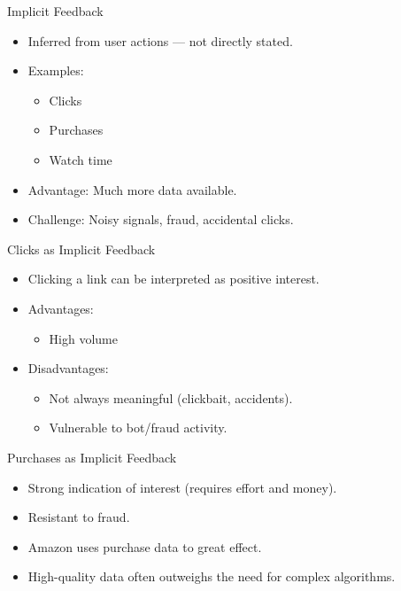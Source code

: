 \documentclass{beamer}
\begin{document}
\begin{frame}{Implicit Feedback}
\begin{itemize}
    \item Inferred from user actions — not directly stated.
    \item Examples:
    \begin{itemize}
        \item Clicks
        \item Purchases
        \item Watch time
    \end{itemize}
    \item Advantage: Much more data available.
    \item Challenge: Noisy signals, fraud, accidental clicks.
\end{itemize}
\end{frame}

\begin{frame}{Clicks as Implicit Feedback}
\begin{itemize}
    \item Clicking a link can be interpreted as positive interest.
    \item Advantages:
    \begin{itemize}
        \item High volume
    \end{itemize}
    \item Disadvantages:
    \begin{itemize}
        \item Not always meaningful (clickbait, accidents).
        \item Vulnerable to bot/fraud activity.
    \end{itemize}
\end{itemize}
\end{frame}

\begin{frame}{Purchases as Implicit Feedback}
\begin{itemize}
    \item Strong indication of interest (requires effort and money).
    \item Resistant to fraud.
    \item Amazon uses purchase data to great effect.
    \item High-quality data often outweighs the need for complex algorithms.
\end{itemize}
\end{frame}
\end{document}
